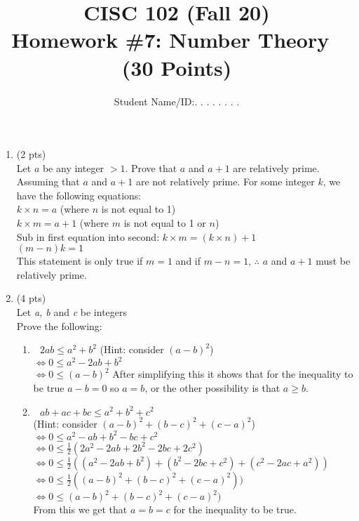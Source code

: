 \documentclass[12pt]{article}
\title{CISC 102 (Fall 20)\\ Homework \#7: Number Theory $\;$   (30 Points) }
\author{Student Name/ID:. . . . . . . .}
\date{}
\begin{document}
\maketitle
\begin{enumerate}
	\item (2 pts) \\
Let \(a\) be any integer \(>1\). Prove that \(a\) and \(a+1\) are relatively prime.
\\Assuming that $a$ and $a+1$ are not relatively prime. For some integer $k$, we have the following equations:
\\$k\times n = a$ (where $n$ is not equal to 1)
\\$k \times m = a + 1$ (where $m$ is not equal to 1 or $n$)
\\Sub in first equation into second: $k\times m = (k\times n)+1$
\\$(m-n)k = 1$
\\This statement is only true if $m=1$ and if $m-n=1$, $\therefore$ $a$ and $a+1$ must be relatively prime.\\


\item  (4 pts) \\
Let {\it  a, b }  and {\it  c }  be integers
\leavevmode\\\relax
Prove the following:
\begin{enumerate}
	\item         \(\text{           } 2ab \leq a^2 + b^2\)           (Hint: consider \((a-b)^2\))
    \\$\Leftrightarrow 0 \leq a^2 -2ab + b^2$
    \\$ \Leftrightarrow 0 \leq (a-b)^2$
    After simplifying this it shows that for the inequality to be true $a-b=0$ so $a=b$, or the other possibility is that $a \ge b$.
		\item          \(\text{           } ab +ac + bc \leq a^2 + b^2 + c^2\)
	\leavevmode\\\relax  (Hint: consider \((a-b)^2 + (b-c)^2 + (c-a)^2\))
    \\$\Leftrightarrow 0 \leq a^2 - ab + b^2 - bc + c^2$
    \\$\Leftrightarrow 0 \leq \frac{1}{2}(2a^2 - 2ab + 2b^2 - 2bc + 2c^2)$
    \\$\Leftrightarrow 0 \leq \frac{1}{2}((a^2-2ab+b^2)+(b^2-2bc+c^2)+(c^2-2ac+a^2))$
    \\$\Leftrightarrow 0 \leq \frac{1}{2}((a-b)^2 + (b-c)^2 + (c-a)^2))$
    \\$\Leftrightarrow 0 \leq (a-b)^2 + (b-c)^2 + (c-a)^2)$
    \\From this we get that $a=b=c$ for the inequality to be true.


\end{enumerate}
\end{enumerate}
\end{document}
